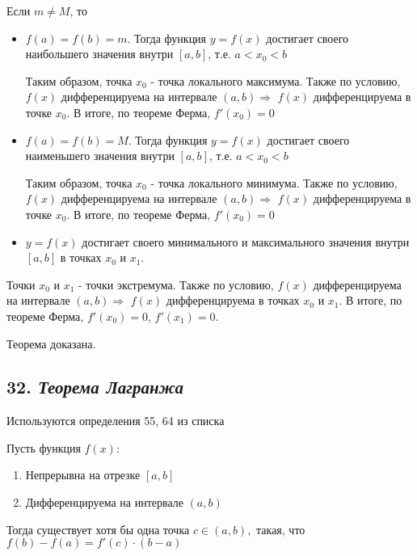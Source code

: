 Если $m \neq M$, то
\begin{itemize}

\item $f(a) = f(b) = m$. Тогда функция $y = f(x)$ достигает своего наибольшего значения внутри $[a, b]$, т.е. $a < x_0 < b$

Таким образом, точка $x_0$ - точка локального максимума. Также по условию, $f(x)$ дифференцируема на интервале $(a, b) \Rightarrow$ $f(x)$ дифференцируема в точке $x_0$. В итоге, по теореме Ферма, $f'(x_0)=0$
\item $f(a) = f(b) = M$. Тогда функция $y = f(x)$ достигает своего наименьшего значения внутри $[a, b]$, т.е. $a < x_0 < b$

Таким образом, точка $x_0$ - точка локального минимума. Также по условию, $f(x)$ дифференцируема на интервале $(a, b) \Rightarrow$ $f(x)$ дифференцируема в точке $x_0$. В итоге, по теореме Ферма, $f'(x_0)=0$
\item $y = f(x)$ достигает своего минимального и максимального значения внутри $[a, b]$ в точках $x_0$ и $ x_1$.

\end{itemize}

Точки $x_0$ и $ x_1$ - точки экстремума. Также по условию, $f(x)$ дифференцируема на интервале $(a, b) \Rightarrow$ $f(x)$ дифференцируема в точках $x_0$ и $x_1$. В итоге, по теореме Ферма, $f'(x_0)=0$, $f'(x_1)=0$.

Теорема доказана.
\newpage 
\subsection*{32. \textit{Теорема Лагранжа}}
\begin{Quote2} 
\small\centering 

Используются определения 55, 64 из списка \end{Quote2} 

Пусть функция $f(x)$:
\begin{enumerate}

\item Непрерывна на отрезке $[a, b]$
\item Дифференцируема на интервале $(a, b)$

\end{enumerate}

Тогда существует хотя бы одна точка $c \in (a, b),$ такая, что $f(b) - f(a) = f'(c)\cdot(b - a)$
\vspace*{20pt} 

